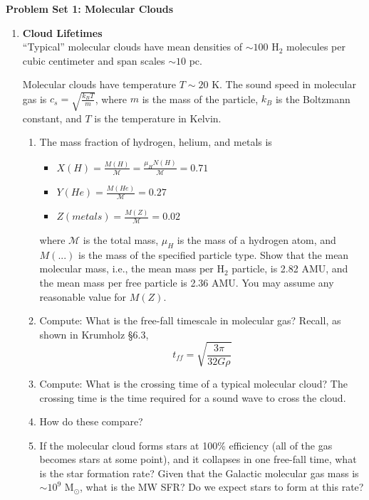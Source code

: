 \documentclass{article}
\newcommand{\msun}{\ensuremath{\mathrm{M}_\odot}\xspace}
\begin{document}
\noindent\textbf{Problem Set 1: Molecular Clouds}

\begin{enumerate}
    \item \textbf{Cloud Lifetimes}\\
``Typical'' molecular clouds have mean densities of $\sim100$ H$_2$ molecules per
cubic centimeter and span scales $\sim10$ pc.


Molecular clouds have temperature $T\sim20$ K.
The sound speed in molecular gas is $c_s = \sqrt{\frac{k_B T}{m}}$, where $m$ is the
mass of the particle, $k_B$ is the Boltzmann constant, and $T$ is the
temperature in Kelvin.

\begin{enumerate}
    \item The mass fraction of hydrogen, helium, and metals is\citep{Kauffmann2008}
        \begin{itemize}
            \item $X(H)=\frac{M(H)}{\mathcal{M}}=\frac{\mu_H N(H)}{\mathcal{M}}=0.71$
            \item $Y(He)=\frac{M(He)}{\mathcal{M}}=0.27$
            \item $Z(metals)=\frac{M(Z)}{\mathcal{M}}=0.02$
        \end{itemize}
        where $\mathcal{M}$ is the total mass, $\mu_H$ is the mass of a
        hydrogen atom, and $M(...)$ is the mass of the specified particle type.
        Show that the mean molecular mass, i.e., the mean mass per H$_2$
        particle, is 2.82 AMU, and the mean mass per free particle is 2.36 AMU.
        You may assume any reasonable value for $M(Z)$.
    \item Compute: What is the free-fall timescale in molecular gas?  
        Recall, as shown in Krumholz \S6.3,
        $$t_{ff} = \sqrt{\frac{3 \pi}{32 G \rho}}$$
    \item Compute: What is the crossing time of a typical molecular cloud?  The
        crossing time is the time required for a sound wave to cross the cloud.
    \item How do these compare?
    \item If the molecular cloud forms stars at 100\% efficiency (all of the
        gas becomes stars at some point), and it collapses in one free-fall
        time, what is the star formation rate?
        Given that the Galactic molecular gas mass is $\sim10^9$ \msun, what is the MW SFR?
        Do we expect stars to form at this rate?
\end{enumerate}


\end{enumerate}
\end{document}
